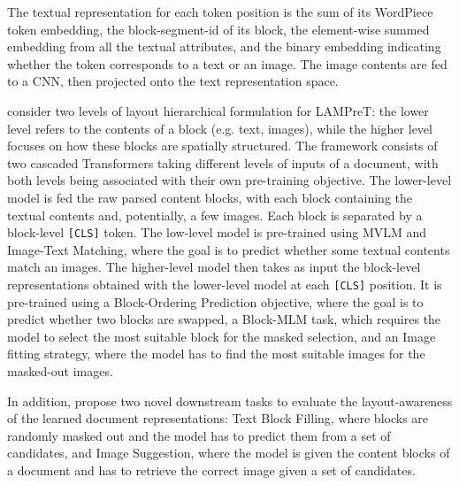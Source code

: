 The textual representation for each token position is the sum of its WordPiece token embedding, the block-segment-id of its block, the element-wise summed embedding from all the textual attributes, and the binary embedding indicating whether the token corresponds to a text or an image. The image contents are fed to a \ac{CNN}, then projected onto the text representation space. 

\citet{wu2021lampret} consider two levels of layout hierarchical formulation for LAMPreT: the lower level refers to the contents of a block (e.g. text, images), while the higher level focuses on how these blocks are spatially structured. The framework consists of two cascaded Transformers taking different levels of inputs of a document, with both levels being associated with their own pre-training objective. The lower-level model is fed the raw parsed content blocks, with each block containing the textual contents and, potentially, a few images. Each block is separated by a block-level \texttt{[CLS]} token. The low-level model is pre-trained using \ac{MVLM} and Image-Text Matching, where the goal is to predict whether some textual contents match an images. The higher-level model then takes as input the block-level representations obtained with the lower-level model at each \texttt{[CLS]} position. It is pre-trained using a Block-Ordering Prediction objective, where the goal is to predict whether two blocks are swapped, a Block-MLM task, which requires the model to select the most suitable block for the masked selection, and an Image fitting strategy, where the model has to find the most suitable images for the masked-out images.

In addition, \citet{wu2021lampret} propose two novel downstream tasks to evaluate the layout-awareness of the learned document representations: Text Block Filling, where blocks are randomly masked out and the model has to predict them from a set of candidates, and Image Suggestion, where the model is given the content blocks of a document and has to retrieve the correct image given a set of candidates.


